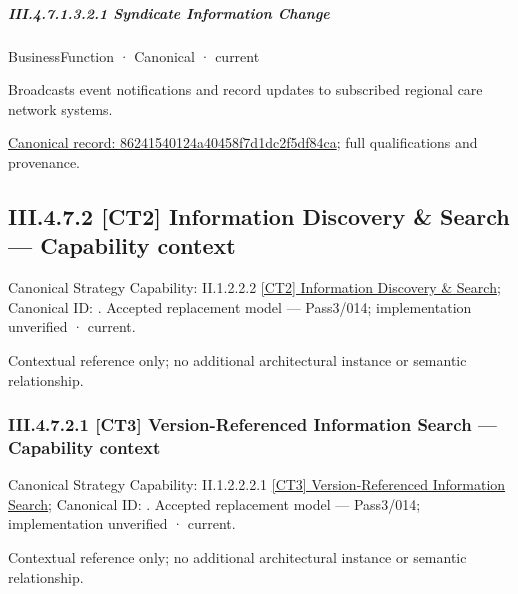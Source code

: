 \subparagraph*{III.4.7.1.3.2.1 Syndicate Information Change}
\label{navigation:III.4.7.1.3.2.1}

\label{element:86241540124a40458f7d1dc2f5df84ca}
{\small BusinessFunction · Canonical · current}\par

Broadcasts event notifications and record updates to subscribed regional care network systems.


{\footnotesize \href{../../../../../../../continuum/business/business-function/86241540124a40458f7d1dc2f5df84ca.md}{Canonical record: 86241540124a40458f7d1dc2f5df84ca}; full qualifications and provenance.}\par
\subsection*{III.4.7.2 [CT2] Information Discovery \& Search — Capability context}
\label{navigation:III.4.7.2}

{\small Canonical Strategy Capability: II.1.2.2.2 \hyperref[element:6621b9a124d7444aa83793810531c388]{[CT2] Information Discovery \& Search}; Canonical ID: \texttt{}. Accepted replacement model — Pass3/014; implementation unverified · current.}\par
Contextual reference only; no additional architectural instance or semantic relationship.\par
\subsubsection*{III.4.7.2.1 [CT3] Version-Referenced Information Search — Capability context}
\label{navigation:III.4.7.2.1}

{\small Canonical Strategy Capability: II.1.2.2.2.1 \hyperref[element:1fb53b4061d04732822c496602c9df6c]{[CT3] Version-Referenced Information Search}; Canonical ID: \texttt{}. Accepted replacement model — Pass3/014; implementation unverified · current.}\par
Contextual reference only; no additional architectural instance or semantic relationship.\par
